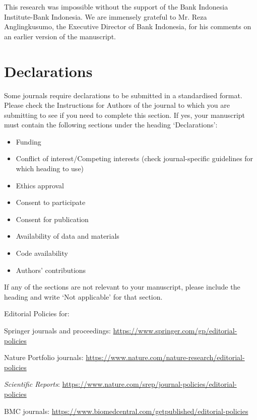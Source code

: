 \documentclass[sn-basic]{sn-jnl}%
\theoremstyle{thmstyleone}%
\theoremstyle{thmstyletwo}%
\theoremstyle{thmstylethree}%
\begin{document}




This research was impossible without the support of the Bank Indonesia Institute-Bank Indonesia. We are immensely grateful to Mr. Reza Anglingkusumo, the Executive Director of Bank Indonesia, for his comments on an earlier version of the manuscript.

\section*{Declarations}

Some journals require declarations to be submitted in a standardised format. Please check the Instructions for Authors of the journal to which you are submitting to see if you need to complete this section. If yes, your manuscript must contain the following sections under the heading `Declarations':

\begin{itemize}
\item Funding
\item Conflict of interest/Competing interests (check journal-specific guidelines for which heading to use)
\item Ethics approval 
\item Consent to participate
\item Consent for publication
\item Availability of data and materials
\item Code availability 
\item Authors' contributions
\end{itemize}

\noindent
If any of the sections are not relevant to your manuscript, please include the heading and write `Not applicable' for that section. 

\bigskip
\begin{flushleft}%
Editorial Policies for:

\bigskip\noindent
Springer journals and proceedings: \url{https://www.springer.com/gp/editorial-policies}

\bigskip\noindent
Nature Portfolio journals: \url{https://www.nature.com/nature-research/editorial-policies}

\bigskip\noindent
\textit{Scientific Reports}: \url{https://www.nature.com/srep/journal-policies/editorial-policies}

\bigskip\noindent
BMC journals: \url{https://www.biomedcentral.com/getpublished/editorial-policies}
\end{flushleft}
\end{document}
